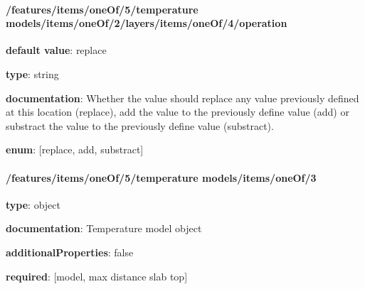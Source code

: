 \begin{itemized}
\end{itemized}\paragraph{/features/items/oneOf/5/temperature models/items/oneOf/2/layers/items/oneOf/4/operation} \begin{itemized}
\item {\bf default value}: replace
\item {\bf type}: string
\item {\bf documentation}: Whether the value should replace any value previously defined at this location (replace), add the value to the previously define value (add) or substract the value to the previously define value (substract).
\item {\bf enum}: [replace, add, substract]\end{itemized}\paragraph{/features/items/oneOf/5/temperature models/items/oneOf/3} \begin{itemized}
\item {\bf type}: object
\item {\bf documentation}: Temperature model object
\item {\bf additionalProperties}: false
\item {\bf required}: [model, max distance slab top]\end{itemized}

